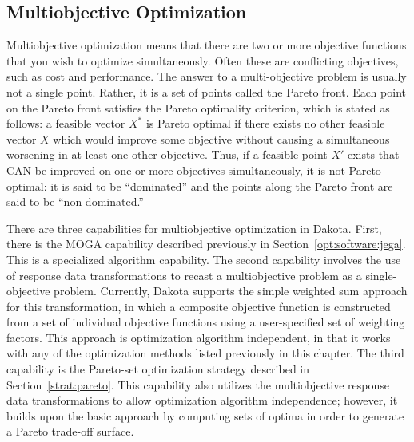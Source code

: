 
\subsection{Multiobjective Optimization}\label{opt:additional:multiobjective}

Multiobjective optimization means that there are two or more objective
functions that you wish to optimize simultaneously. Often these are
conflicting objectives, such as cost and performance. The answer to a
multi-objective problem is usually not a single point. Rather, it is
a set of points called the Pareto front. Each point on the Pareto
front satisfies the Pareto optimality criterion, which is stated as
follows: a feasible vector $X^{*}$ is Pareto optimal if there
exists no other feasible vector $X$ which would improve some
objective without causing a simultaneous worsening in at least one
other objective. Thus, if a feasible point $X'$ exists that
CAN be improved on one or more objectives simultaneously, it is not
Pareto optimal: it is said to be ``dominated'' and the points along
the Pareto front are said to be ``non-dominated.''

There are three capabilities for multiobjective optimization in
Dakota. First, there is the MOGA capability described previously in
Section~\ref{opt:software:jega}. This is a specialized algorithm
capability. The second capability involves the use of response data
transformations to recast a multiobjective problem as a
single-objective problem. Currently, Dakota supports the simple
weighted sum approach for this transformation, in which a composite
objective function is constructed from a set of individual objective
functions using a user-specified set of weighting factors. This
approach is optimization algorithm independent, in that it works with
any of the optimization methods listed previously in this chapter.
The third capability is the Pareto-set optimization strategy described
in Section~\ref{strat:pareto}. This capability also utilizes the
multiobjective response data transformations to allow optimization
algorithm independence; however, it builds upon the basic approach by
computing sets of optima in order to generate a Pareto trade-off
surface.

